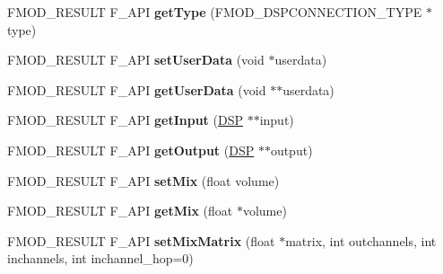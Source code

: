 \begin{DoxyCompactItemize}
\mbox{\label{classFMOD_1_1DSPConnection_ad99191423ae49d15b2b3ee7c192b53b4}} 
F\+M\+O\+D\+\_\+\+R\+E\+S\+U\+LT F\+\_\+\+A\+PI {\bfseries get\+Type} (F\+M\+O\+D\+\_\+\+D\+S\+P\+C\+O\+N\+N\+E\+C\+T\+I\+O\+N\+\_\+\+T\+Y\+PE $\ast$type)
\item 
\mbox{\label{classFMOD_1_1DSPConnection_ab3d3a0dc61be71656ee5b1b5d7dab50d}} 
F\+M\+O\+D\+\_\+\+R\+E\+S\+U\+LT F\+\_\+\+A\+PI {\bfseries set\+User\+Data} (void $\ast$userdata)
\item 
\mbox{\label{classFMOD_1_1DSPConnection_ad9db81fe98ee0eecb099a565d5ae2a4d}} 
F\+M\+O\+D\+\_\+\+R\+E\+S\+U\+LT F\+\_\+\+A\+PI {\bfseries get\+User\+Data} (void $\ast$$\ast$userdata)
\item 
\mbox{\label{classFMOD_1_1DSPConnection_a4885524212e3f791debfac1ec259ee6a}} 
F\+M\+O\+D\+\_\+\+R\+E\+S\+U\+LT F\+\_\+\+A\+PI {\bfseries get\+Input} (\hyperlink{classFMOD_1_1DSP}{D\+SP} $\ast$$\ast$input)
\item 
\mbox{\label{classFMOD_1_1DSPConnection_a813e7b67af3dcf1fad6b8ed73ad99a8d}} 
F\+M\+O\+D\+\_\+\+R\+E\+S\+U\+LT F\+\_\+\+A\+PI {\bfseries get\+Output} (\hyperlink{classFMOD_1_1DSP}{D\+SP} $\ast$$\ast$output)
\item 
\mbox{\label{classFMOD_1_1DSPConnection_a67b8373d3bead0903909ac035acfa47d}} 
F\+M\+O\+D\+\_\+\+R\+E\+S\+U\+LT F\+\_\+\+A\+PI {\bfseries set\+Mix} (float volume)
\item 
\mbox{\label{classFMOD_1_1DSPConnection_a21bceb2d4e9d4f951c137d7a2bc95572}} 
F\+M\+O\+D\+\_\+\+R\+E\+S\+U\+LT F\+\_\+\+A\+PI {\bfseries get\+Mix} (float $\ast$volume)
\item 
\mbox{\label{classFMOD_1_1DSPConnection_ace26b82a7ab3795e80a28e913d2125f2}} 
F\+M\+O\+D\+\_\+\+R\+E\+S\+U\+LT F\+\_\+\+A\+PI {\bfseries set\+Mix\+Matrix} (float $\ast$matrix, int outchannels, int inchannels, int inchannel\+\_\+hop=0)
\item 
\mbox{\label{classFMOD_1_1DSPConnection_ab374698ec55adfc99a92b915f3d588f0}} 
$$
\end{DoxyCompactItemize}
